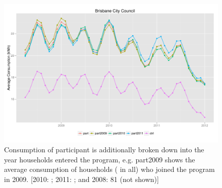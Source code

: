 \documentclass[a4paper,11pt]{article}
\begin{document}
\begin{figure}
\begin{center}
\includegraphics[width=1\textwidth]{figures/BrisbaneConsump.pdf}
\caption{Consumption of participant is additionally broken down into the
year households entered the program, e.g. part2009 shows the average
consumption of households ( in all) who joined the program
in 2009. [2010: ; 2011: ; and 2008: 81
(not shown)]}
\end{center}
\end{figure}
\end{document}
